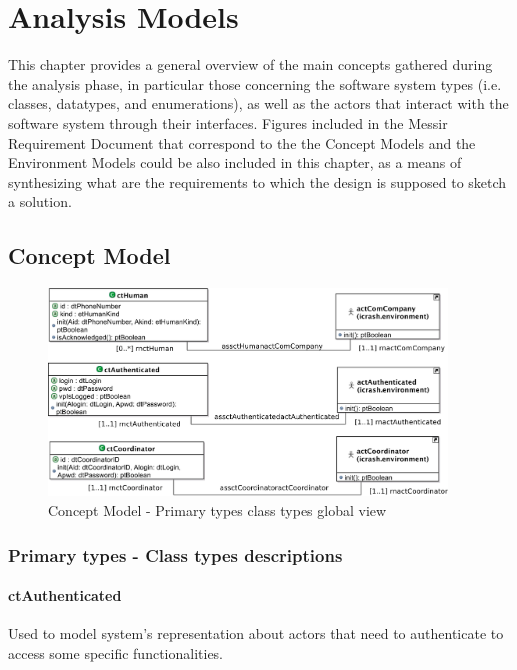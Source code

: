 \chapter{Analysis Models}
\label{chap:AM}

This chapter provides a general overview of the main concepts gathered during
the analysis phase, in particular those concerning the software system types
(i.e. classes, datatypes, and enumerations), as well as the actors that interact
with the software system through their interfaces. Figures included in the
Messir Requirement Document that correspond to the  the \glspl{Concept Model} and the \glspl{Environment
Model} could be also included in this chapter, as a means of synthesizing what
are the requirements to which the design is supposed to sketch a solution.




\section{Concept Model}

\begin{figure}[H]
\begin{center}
  \includegraphics[width=400px]{images/analysis/concept-model/global/PrimaryTypes-Classes/01/cm-pt-ct-gv-01.eps}
  \caption{Concept Model - Primary types class types global view}
  \label{figureLabel}
\end{center}
\end{figure}

\subsection{Primary types - Class types descriptions}

\subsubsection{ctAuthenticated}
Used to model system’s representation about actors that need to authenticate to
access some specific functionalities.

